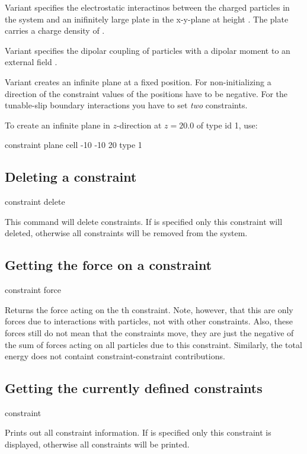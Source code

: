 Variant  specifies the electrostatic interactinos between
the charged particles in the system and an inifinitely large plate in
the x-y-plane at height . The plate carries a charge density of
.
  
Variant  specifies the dipolar coupling of particles with a
dipolar moment to an external field   .

Variant  creates an infinite plane at a fixed position. For
non-initializing a direction of the constraint values of the positions
have to be negative. For the tunable-slip boundary interactions you
have to set \emph{two} constraints.

To create an infinite plane in $z$-direction at $z=20.0$ of type id 1,
use:
\begin{code}
  constraint plane cell -10 -10 20 type 1
\end{code}

\subsection{Deleting a constraint}
\begin{essyntax}
  constraint delete  
\end{essyntax}

This command will delete constraints. If  is specified only this
constraint will deleted, otherwise all constraints will be removed from the
system. 

\subsection{Getting the force on a constraint}
\begin{essyntax}
constraint force  
\end{essyntax}
Returns the force acting on the th constraint. Note, however, that this
are only forces due to interactions with particles, not with other constraints.
Also, these forces still do not mean that the constraints move, they are just
the negative of the sum of forces acting on all particles due to this constraint.
Similarly, the total energy does not containt constraint-constraint contributions.


\subsection{Getting the currently defined constraints}
\begin{essyntax}
constraint   
\end{essyntax}
Prints out all constraint information. If  is specified only this
constraint is displayed, otherwise all constraints will be printed.

